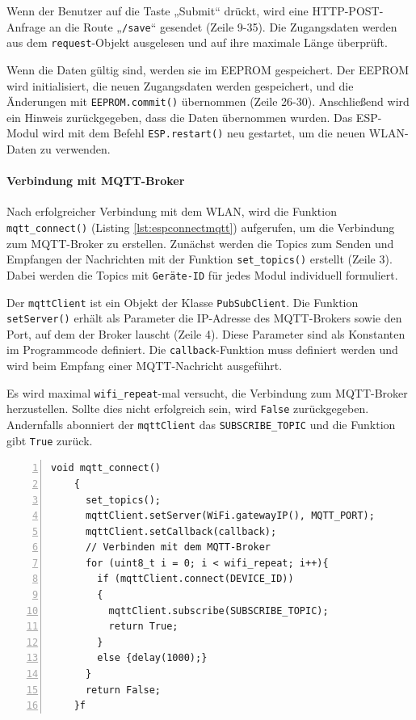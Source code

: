\documentclass[12pt, letterpaper]{article}
\begin{document}
  \par Wenn der Benutzer auf die Taste „Submit“ drückt, wird eine HTTP-POST-Anfrage an die Route „\texttt{/save}“ gesendet (Zeile 9-35). Die Zugangsdaten werden aus dem \texttt{request}-Objekt ausgelesen und auf ihre maximale Länge überprüft. \par Wenn die Daten gültig sind, werden sie im EEPROM gespeichert. Der EEPROM wird initialisiert, die neuen Zugangsdaten werden gespeichert, und die Änderungen mit \texttt{EEPROM.commit()} übernommen (Zeile 26-30). Anschließend wird ein Hinweis zurückgegeben, dass die Daten übernommen wurden. Das ESP-Modul wird mit dem Befehl \texttt{ESP.restart()} neu gestartet, um die neuen WLAN-Daten zu verwenden.
  \paragraph{Verbindung mit MQTT-Broker}
  \par \textbf{}
  \par Nach erfolgreicher Verbindung mit dem WLAN, wird die Funktion \texttt{mqtt\_connect()} (Listing \ref{lst:espconnectmqtt}) aufgerufen, um die Verbindung zum MQTT-Broker zu erstellen. Zunächst werden die Topics zum Senden und Empfangen der Nachrichten mit der Funktion \texttt{set\_topics()} erstellt (Zeile 3). Dabei werden die Topics mit \texttt{Geräte-ID} für jedes Modul individuell formuliert.
  \par Der \texttt{mqttClient} ist ein Objekt der Klasse \texttt{PubSubClient}. Die Funktion \texttt{setServer()} erhält als Parameter die IP-Adresse des MQTT-Brokers sowie den Port, auf dem der Broker lauscht (Zeile 4). Diese Parameter sind als Konstanten im Programmcode definiert. Die \texttt{callback}-Funktion muss definiert werden und wird beim Empfang einer MQTT-Nachricht ausgeführt. 
  \par Es wird maximal \texttt{wifi\_repeat}-mal versucht, die Verbindung zum MQTT-Broker herzustellen. Sollte dies nicht erfolgreich sein, wird \texttt{False} zurückgegeben. Andernfalls abonniert der \texttt{mqttClient} das \texttt{SUBSCRIBE\_TOPIC} und die Funktion gibt \texttt{True} zurück.
  \begin{lstlisting}[frame=single, style=cpp, numbers=left, label={lst:espconnectmqtt}, caption={ESP: mqtt\_connect}]
    void mqtt_connect()
    {
      set_topics();
      mqttClient.setServer(WiFi.gatewayIP(), MQTT_PORT);
      mqttClient.setCallback(callback);
      // Verbinden mit dem MQTT-Broker
      for (uint8_t i = 0; i < wifi_repeat; i++){
        if (mqttClient.connect(DEVICE_ID))
        {
          mqttClient.subscribe(SUBSCRIBE_TOPIC);
          return True;
        }
        else {delay(1000);}
      }
      return False;
    }f
  \end{lstlisting}
  \pagebreak
\end{document}
